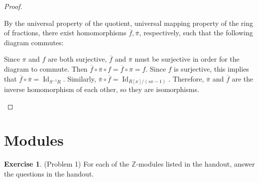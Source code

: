 \documentclass[12pt, psamsfonts]{amsart}
\theoremstyle{definition}
\newtheorem*{exer}{Exercise}
\theoremstyle{remark}
\DeclareMathOperator{\Id}{Id}
\numberwithin{equation}{section}
\begin{document}
\begin{proof}
\begin{itemize}
      By the universal property of the quotient, universal mapping property of the ring of fractions, there exist homomorphisms $\overline{f}, \overline{\pi}$, respectively, such that the following diagram commutes:
      \begin{center}
      \end{center}
      Since $\pi$ and $f$ are both surjective, $\overline{f}$ and $\overline{\pi}$ must be surjective in order for the diagram to commute.
      Then $\overline{f} \circ \overline{\pi} \circ f = \overline{f} \circ \pi = f$.
      Since $f$ is surjective, this implies that $\overline{f} \circ \overline{\pi} = \Id_{S^{-1}R}$.
      Similarly, $\overline{\pi} \circ \overline{f} = \Id_{R[x]/(sx - 1)}$.
      Therefore, $\overline{\pi}$ and $\overline{f}$ are the inverse homomorphism of each other, so they are isomorphisms.
  \end{itemize}
\end{proof}

\section{Modules}

\begin{exer}{(Problem 1)}
  For each of the $\mathbb{Z}$-modules listed in the handout, answer the questions in the handout.
\end{exer}
\end{document}
